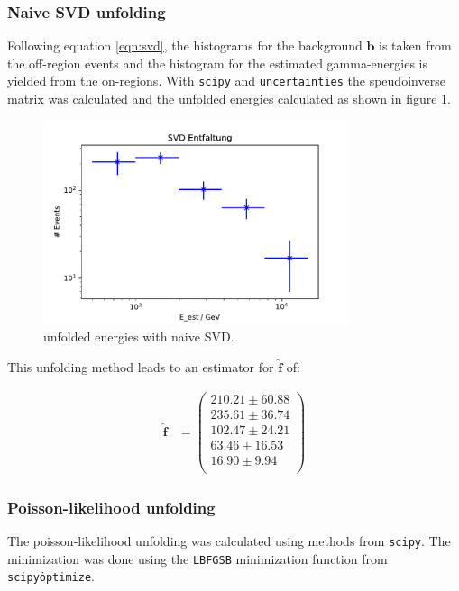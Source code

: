 \subsubsection{Naive SVD unfolding}
Following equation \eqref{eqn:svd}, the histograms for the background $\symbf{b}$ is taken from the off-region events 
and the histogram for the estimated gamma-energies is yielded from the on-regions.
With \texttt{scipy} and \texttt{uncertainties} the speudoinverse matrix was calculated and the unfolded energies calculated as shown in figure \ref{fig:svdUnfold}.

\begin{figure}[H]
  \centering
  \includegraphics[width=0.8\textwidth]{plots/NSVD.pdf}
  \caption{unfolded energies with naive SVD.}
  \label{fig:svdUnfold}
\end{figure}

This unfolding method leads to an estimator for $\hat{\symbf{f}}$ of:

\begin{align}
\hat{\symbf{f}} &= 
\begin{pmatrix}
     210.21 \pm 60.88 \\
     235.61 \pm 36.74 \\
     102.47 \pm 24.21 \\
     63.46 \pm 16.53 \\ 
     16.90 \pm 9.94 \\
\end{pmatrix}
\end{align}


\subsubsection{Poisson-likelihood unfolding}
The poisson-likelihood unfolding was calculated using methods from \texttt{scipy}.
The minimization was done using the \texttt{L\-BFGS\-B} minimization 
function from \texttt{scipy\.optimize}.


